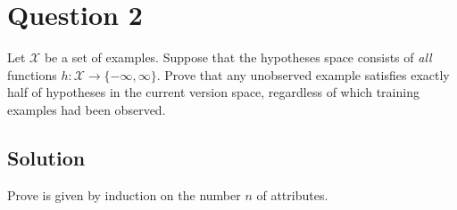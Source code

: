 \section*{Question 2}

Let $\mathcal{X}$ be a set of examples. Suppose that the hypotheses space consists of \textit{all} functions $h : \mathcal{X} \longrightarrow \{-\infty, \infty \}$. Prove that any unobserved example satisfies exactly half of hypotheses in the current version space, regardless of which training examples had been observed.

\subsection*{Solution}

Prove is given by induction on the number $n$ of attributes.

